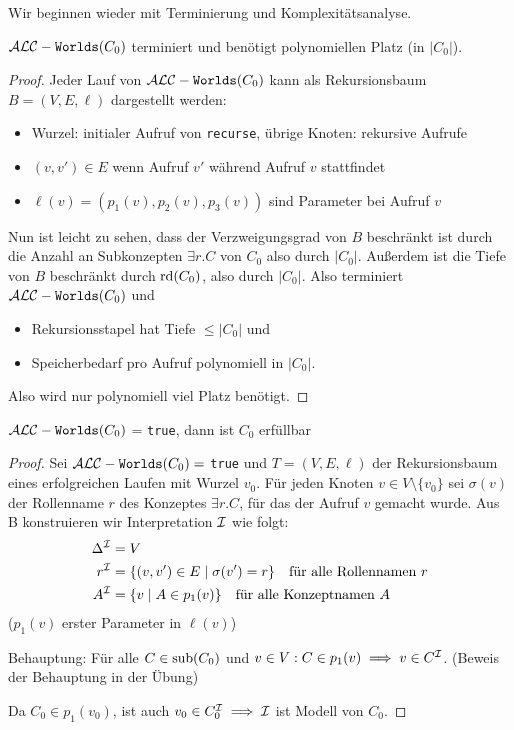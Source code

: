 Wir beginnen wieder mit Terminierung und Komplexitätsanalyse.

\begin{lemma}
    $\mathcal{A}\mathcal{L}\mathcal{C}-\texttt{Worlds}(C_0)$ terminiert und benötigt polynomiellen Platz (in $|C_0|$).
\end{lemma}

\begin{proof}
    Jeder Lauf von $\mathcal{A}\mathcal{L}\mathcal{C}-\texttt{Worlds}(C_0)$ kann als Rekursionsbaum $B = (V, E, \ell)$ dargestellt werden:
    \begin{itemize}
        \item Wurzel: initialer Aufruf von \texttt{recurse}, übrige Knoten: rekursive Aufrufe
        \item $(v, v') \in E$ wenn Aufruf $v'$ während Aufruf $v$ stattfindet
        \item $\ell(v) = (p_1(v), p_2(v), p_3(v))$ sind Parameter bei Aufruf $v$
    \end{itemize}
    Nun ist leicht zu sehen, dass der Verzweigungsgrad von $B$ beschränkt ist durch die Anzahl an Subkonzepten $\exists r.C$ von $C_0$ also durch $|C_0|$. Außerdem ist die Tiefe von $B$ beschränkt durch $\operatorname{rd}(C_0)$, also durch $|C_0|$.
    Also terminiert $\mathcal{A}\mathcal{L}\mathcal{C}-\texttt{Worlds}(C_0)$ und
    \begin{itemize}
        \item Rekursionsstapel hat Tiefe $\leq |C_0|$ und
        \item Speicherbedarf pro Aufruf polynomiell in $|C_0|$.
    \end{itemize}
    Also wird nur polynomiell viel Platz benötigt.
\end{proof}

\begin{lemma}
    $\mathcal{A}\mathcal{L}\mathcal{C}-\texttt{Worlds}(C_0)$ = \texttt{true}, dann ist $C_0$ erfüllbar
\end{lemma}

\begin{proof}
    Sei $\mathcal{A}\mathcal{L}\mathcal{C}-\texttt{Worlds}(C_0) = $ \texttt{true} und $T = (V, E, \ell)$ der Rekursionsbaum eines erfolgreichen Laufen mit Wurzel $v_0$. Für jeden Knoten $v \in V \setminus \{v_0\}$ sei $\sigma(v)$ der Rollenname $r$ des Konzeptes $\exists r.C$, für das der Aufruf $v$ gemacht wurde. Aus B konstruieren wir Interpretation $\mathcal{I}$ wie folgt:
    \begin{align*}
        \Delta^{\mathcal{I}} &= V\\
        r^{\mathcal{I}} &= \{(v, v') \in E \mid \sigma(v') = r\} \quad \text{für alle Rollennamen } r\\
        A^{\mathcal{I}} &= \{v \mid A \in p_1(v)\} \quad \text{für alle Konzeptnamen } A\\
    \end{align*}
    ($p_1(v)$ erster Parameter in $\ell(v)$)

    Behauptung: Für alle $C \in \operatorname{sub}(C_0)$ und $v \in V : C \in p_1(v) \implies v \in C^{\mathcal{I}}$. (Beweis der Behauptung in der Übung)

    Da $C_0 \in p_1(v_0)$, ist auch $v_0 \in C_0^{\mathcal{I}} \implies \mathcal{I}$ ist Modell von $C_0$.
\end{proof}


